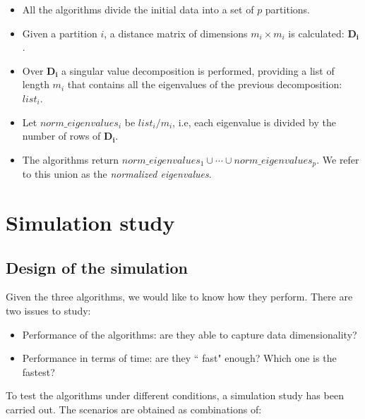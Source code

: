 \documentclass[11pt]{report}
\begin{document}
\begin{itemize}
\item All the algorithms divide the initial data into a set of $p$ partitions.

\item Given a partition $i$, a distance matrix of dimensions $m_i \times m_i$
is calculated: $\mathbf{D_i}$. 

\item Over $\mathbf{D_i}$ a singular value decomposition is performed, providing 
a list of length $m_i$ that contains all the eigenvalues of the previous 
decomposition: $list_i$.

\item Let $norm\_eigenvalues_i$ be $list_i/m_i$, i.e, each eigenvalue is divided
by the number of rows of $\mathbf{D_i}$.

\item The algorithms return 
$norm\_eigenvalues_1 \cup \cdots \cup norm\_eigenvalues_p$. We refer to 
this union as the \textit{normalized eigenvalues}. 

\end{itemize}





\chapter{Simulation study}
\label{chap:sim}

\section{Design of the simulation}


Given the three algorithms, we would like to know how they perform. There 
are two issues to study:

\begin{itemize}
\item Performance of the algorithms: are they able to capture data
dimensionality?
\item Performance in terms of time: are they `` fast" enough? Which one is 
the fastest?
\end{itemize}

To test the algorithms under different conditions, a simulation study has been
carried out. The scenarios are obtained as combinations of:
\end{document}

